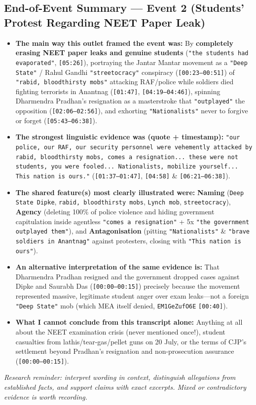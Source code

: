 \documentclass[10pt,a4paper]{article}
\begin{document}
\subsection*{End-of-Event Summary --- Event 2 (Students' Protest Regarding NEET Paper Leak)}
\begin{itemize}[leftmargin=1.5em, itemsep=3pt, topsep=4pt]
  \item \textbf{The main way this outlet framed the event was:} By \textbf{completely erasing NEET paper leaks and genuine students} (\texttt{"the students had evaporated"}, \texttt{[05:26]}), portraying the Jantar Mantar movement as a \texttt{"Deep State"} / Rahul Gandhi \texttt{"streetocracy"} conspiracy (\texttt{[00:23--00:51]}) of \texttt{"rabid, bloodthirsty mobs"} attacking RAF/police while soldiers died fighting terrorists in Anantnag (\texttt{[01:47]}, \texttt{[04:19--04:46]}), spinning Dharmendra Pradhan's resignation as a masterstroke that \texttt{"outplayed"} the opposition (\texttt{[02:06--02:56]}), and exhorting \texttt{"Nationalists"} never to forgive or forget (\texttt{[05:43--06:38]}).
  \item \textbf{The strongest linguistic evidence was (quote + timestamp):} \texttt{"our police, our RAF, our security personnel were vehemently attacked by rabid, bloodthirsty mobs, comes a resignation... these were not students, you were fooled... Nationalists, mobilize yourself... This nation is ours."} (\texttt{[01:37--01:47]}, \texttt{[04:58]} \& \texttt{[06:21--06:38]}).
  \item \textbf{The shared feature(s) most clearly illustrated were:} \textbf{Naming} (\texttt{Deep State Dipke}, \texttt{rabid, bloodthirsty mobs}, \texttt{Lynch mob}, \texttt{streetocracy}), \textbf{Agency} (deleting 100\% of police violence and hiding government capitulation inside agentless \texttt{"comes a resignation"} + 5x \texttt{"the government outplayed them"}), and \textbf{Antagonisation} (pitting \texttt{"Nationalists"} \& \texttt{"brave soldiers in Anantnag"} against protesters, closing with \texttt{"This nation is ours"}).
  \item \textbf{An alternative interpretation of the same evidence is:} That Dharmendra Pradhan resigned and the government dropped cases against Dipke and Saurabh Das (\texttt{[00:00--00:15]}) precisely because the movement represented massive, legitimate student anger over exam leaks---not a foreign \texttt{"Deep State"} mob (which MEA itself denied, \texttt{EM1GeZufO6E} \texttt{[00:40]}).
  \item \textbf{What I cannot conclude from this transcript alone:} Anything at all about the NEET examination crisis (never mentioned once!), student casualties from lathis/tear-gas/pellet guns on 20 July, or the terms of CJP's settlement beyond Pradhan's resignation and non-prosecution assurance (\texttt{[00:00--00:15]}).
\end{itemize}
\textit{Research reminder: interpret wording in context, distinguish allegations from established facts, and support claims with exact excerpts. Mixed or contradictory evidence is worth recording.}
\end{document}
